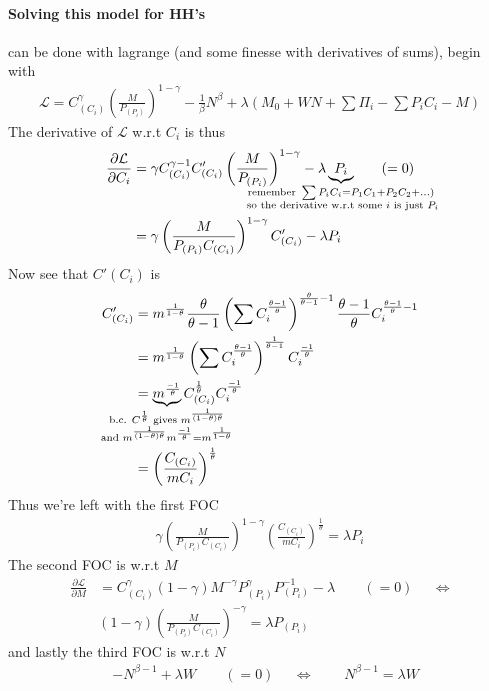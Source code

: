 \documentclass[12pt, a4paper]{article}
\begin{document}
\begin{spacing}{1.213}
\paragraph{Solving this model for HH's} can be done with lagrange (and some finesse with derivatives of sums), begin with 
\begin{align*}
\mathcal{L} = C_{(C_i)}^{\gamma} \left( \frac{M}{P_{(P_i)}} \right)^{1-\gamma} - \frac{1}{\beta}N^{\beta} + \lambda \left( M_0 + WN + \sum \Pi_i - \sum P_i C_i - M \right)
\end{align*}
The derivative of $\mathcal{L}$ w.r.t $C_i$ is thus 
\begin{align*}
\frac{\partial \mathcal{L}}{\partial C_i} &= \gamma C_{(C_i)}^{\gamma -1 }C'_{(C_i)} \left( \frac{M}{P_{(P_i)}}\right)^{1 - \gamma} - \lambda \underbrace{P_i}_{\mathclap{\substack{\textrm{remember } \sum P_i C_i = P_1C_1 + P_2C_2 +  ... ) \\  \textrm{ so the derivative w.r.t some } i \textrm{ is just } P_i}}} \qquad (=0)
\\
&= \gamma \left( \frac{M}{P_{(P_i)}C_{(C_i)}} \right)^{1-\gamma} C'_{(C_i)} - \lambda P_i
\end{align*}
Now see that $C'(C_i)$ is 
\begin{align*}
C'_{(C_i)} &= m^{\frac{1}{1-\theta}} \frac{\theta}{\theta -1} \left( \sum C_i^{\frac{\theta -1 }{\theta}} \right)^{\frac{\theta}{\theta-1}-1} \frac{\theta-1}{\theta} C_i^{\frac{\theta -1}{\theta} -1} 
\\
& = m^{\frac{1}{1-\theta}} \left( \sum C_i^{\frac{\theta -1 }{\theta}} \right)^{\frac{1}{\theta-1}} C_i^{\frac{-1}{\theta}} 
\\
&= \underbrace{m^\frac{-1}{\theta}}_{\mathclap{ \substack{
\textrm{b.c. } C^{\frac{1}{\theta}} \textrm{ gives } m^{\frac{1}{(1-\theta)\theta}} \\
\textrm{and } m^{\frac{1}{(1-\theta)\theta}}m^{\frac{-1}{\theta}} = m^{\frac{1}{1-\theta}}
}}} 
C_{(C_i)}^{\frac{1}{\theta}} C_i^{\frac{-1}{\theta}}
\\
& = \left( \frac{C_{(C_i)}}{m C_i} \right)^{\frac{1}{\theta}}
\end{align*}
Thus we're left with the first FOC
\begin{align*}
\gamma \left( \frac{M}{P_{(P_i)}C_{(C_i)}} \right)^{1-\gamma} \left( \frac{C_{(C_i)}}{m C_i} \right)^{\frac{1}{\theta}} = \lambda P_i
\end{align*}
The second FOC is w.r.t $M$
\begin{align*}
\frac{\partial \mathcal{L}}{\partial M} &= C_{(C_i)}^{\gamma}(1-\gamma)M^{-\gamma}P_{(P_i)}^{\gamma}P_{(P_i)}^{-1} - \lambda  \qquad (= 0) && \Leftrightarrow \\
& (1-\gamma)\left( \frac{M}{P_{(P_i)}C_{(C_i)}} \right)^{-\gamma} = \lambda P_{(P_i)}
\end{align*}
and lastly the third FOC is w.r.t $N$
\begin{align*}
&-N^{\beta-1} + \lambda W \qquad (=0) && \Leftrightarrow &&& N^{\beta-1}= \lambda W
\end{align*}


\end{spacing}
\end{document}
